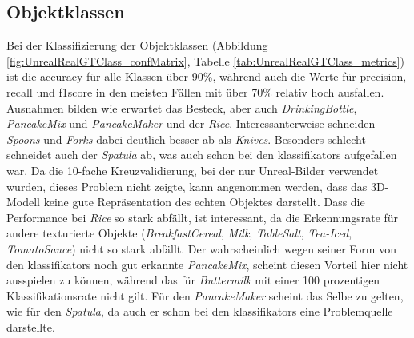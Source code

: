 \subsection{Objektklassen}

Bei der Klassifizierung der Objektklassen (Abbildung \ref{fig:UnrealRealGTClass_confMatrix}, Tabelle \ref{tab:UnrealRealGTClass_metrics}) ist die \gls{accuracy} für alle Klassen über 90\%, während auch die Werte für \gls{precision}, \gls{recall} und \gls{f1score} in den meisten Fällen mit über 70\% relativ hoch ausfallen. Ausnahmen bilden wie erwartet das Besteck, aber auch \textit{DrinkingBottle}, \textit{PancakeMix} und \textit{PancakeMaker} und der \textit{Rice}. Interessanterweise schneiden \textit{Spoons} und \textit{Forks} dabei deutlich besser ab als \textit{Knives}. Besonders schlecht schneidet auch der \textit{Spatula} ab, was auch schon bei den \glspl{klassifikator} aufgefallen war. Da die 10-fache Kreuzvalidierung, bei der nur Unreal-Bilder verwendet wurden, dieses Problem nicht zeigte, kann angenommen werden, dass das 3D-Modell keine gute Repräsentation des echten Objektes darstellt. Dass die Performance bei \textit{Rice} so stark abfällt, ist interessant, da die Erkennungsrate für andere texturierte Objekte (\textit{BreakfastCereal}, \textit{Milk}, \textit{TableSalt}, \textit{Tea-Iced}, \textit{TomatoSauce}) nicht so stark abfällt. Der wahrscheinlich wegen seiner Form von den \glspl{klassifikator} noch gut erkannte \textit{PancakeMix}, scheint diesen Vorteil hier nicht ausspielen zu können, während das für \textit{Buttermilk} mit einer 100 prozentigen Klassifikationsrate nicht gilt. Für den \textit{PancakeMaker} scheint das Selbe zu gelten, wie für den \textit{Spatula}, da auch er schon bei den \glspl{klassifikator} eine Problemquelle darstellte. 

